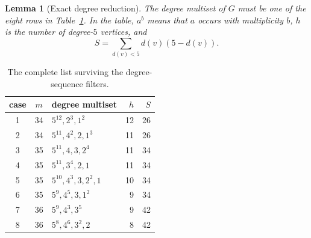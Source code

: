 \documentclass[11pt]{article}
\newtheorem{lemma}[theorem]{Lemma}
\begin{document}
\begin{lemma}[Exact degree reduction]\label{lem:eight}
The degree multiset of $G$ must be one of the eight rows in
Table~\ref{tab:degrees}.  In the table, $a^b$ means that $a$ occurs with
multiplicity $b$, $h$ is the number of degree-$5$ vertices, and
\[
 S=\sum_{d(v)<5}d(v)(5-d(v)).
\]
\end{lemma}

\begin{table}[ht]
\centering
\caption{The complete list surviving the degree-sequence filters.}
\label{tab:degrees}
\begin{tabular}{@{}cclrr@{}}
\toprule
case & $m$ & degree multiset & $h$ & $S$\\
\midrule
1 & 34 & $5^{12},2^3,1^2$       & 12 & 26\\
2 & 34 & $5^{11},4^2,2,1^3$     & 11 & 26\\
3 & 35 & $5^{11},4,3,2^4$       & 11 & 34\\
4 & 35 & $5^{11},3^4,2,1$       & 11 & 34\\
5 & 35 & $5^{10},4^3,3,2^2,1$   & 10 & 34\\
6 & 35 & $5^9,4^5,3,1^2$        &  9 & 34\\
7 & 36 & $5^9,4^3,3^5$          &  9 & 42\\
8 & 36 & $5^8,4^6,3^2,2$        &  8 & 42\\
\bottomrule
\end{tabular}
\end{table}
\end{document}
